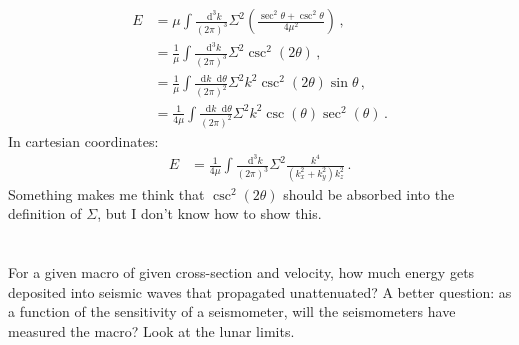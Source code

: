 \documentclass{article}
\newcommand*\diff{\mathop{}\!\mathrm{d}}
\newcommand*\p[1]{\left(#1\right)}
\newcommand*\f[2]{\frac{#1}{#2}}
\begin{document}
\begin{align}
E&=\mu\int\f{\diff^3 k}{(2\pi)^3}\Sigma^2\p{\f{\sec^2\theta+\csc^2\theta}{4\mu^2}}\,,\\
&=\f{1}{\mu}\int\f{\diff^3 k}{(2\pi)^3}\Sigma^2\csc^2(2\theta)\,,\\
&=\f{1}{\mu}\int\f{\diff k\diff\theta}{(2\pi)^2}\Sigma^2k^2\csc^2(2\theta)\sin\theta\,,\\
&=\f{1}{4\mu}\int\f{\diff k\diff\theta}{(2\pi)^2}\Sigma^2k^2\csc(\theta)\sec^2(\theta)\,.
\end{align}
In cartesian coordinates:
\begin{align}
E&=\f{1}{4\mu}\int\f{\diff^3 k}{(2\pi)^3}\Sigma^2\f{k^4}{(k_x^2+k_y^2)k_z^2}\,.
\end{align}
Something makes me think that $\csc^2(2\theta)$ should be absorbed into the definition of $\Sigma$, but I don't know how to show this.
\section{}
For a given macro of given cross-section and velocity, how much energy gets deposited into seismic waves that propagated unattenuated? A better question: as a function of the sensitivity of a seismometer, will the seismometers have measured the macro? Look at the lunar limits.
\pagebreak
\end{document}
